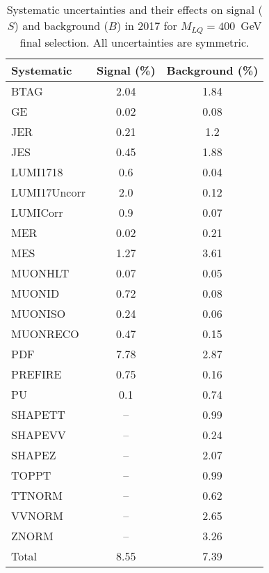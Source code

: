 \begin{table}[htbp]
\begin{center}
\caption{Systematic uncertainties and their effects on signal ($S$) and background ($B$) in 2017 for $M_{LQ}=400$~GeV final selection. All uncertainties are symmetric.}
\begin{tabular}{lcc}
\hline\hline
Systematic & Signal (\%) & Background (\%) \\ \hline 
BTAG & 2.04 & 1.84\\ 
GE & 0.02 & 0.08\\ 
JER & 0.21 & 1.2\\ 
JES & 0.45 & 1.88\\ 
LUMI1718 & 0.6 & 0.04\\ 
LUMI17Uncorr & 2.0 & 0.12\\ 
LUMICorr & 0.9 & 0.07\\ 
MER & 0.02 & 0.21\\ 
MES & 1.27 & 3.61\\ 
MUONHLT & 0.07 & 0.05\\ 
MUONID & 0.72 & 0.08\\ 
MUONISO & 0.24 & 0.06\\ 
MUONRECO & 0.47 & 0.15\\ 
PDF & 7.78 & 2.87\\ 
PREFIRE & 0.75 & 0.16\\ 
PU & 0.1 & 0.74\\ 
SHAPETT & -- & 0.99\\ 
SHAPEVV & -- & 0.24\\ 
SHAPEZ & -- & 2.07\\ 
TOPPT & -- & 0.99\\ 
TTNORM & -- & 0.62\\ 
VVNORM & -- & 2.65\\ 
ZNORM & -- & 3.26\\ 
Total & 8.55 & 7.39\\ \hline \hline
\end{tabular}
\label{tab:SysUncertainties_uujj_400}
\end{center}
\end{table}

